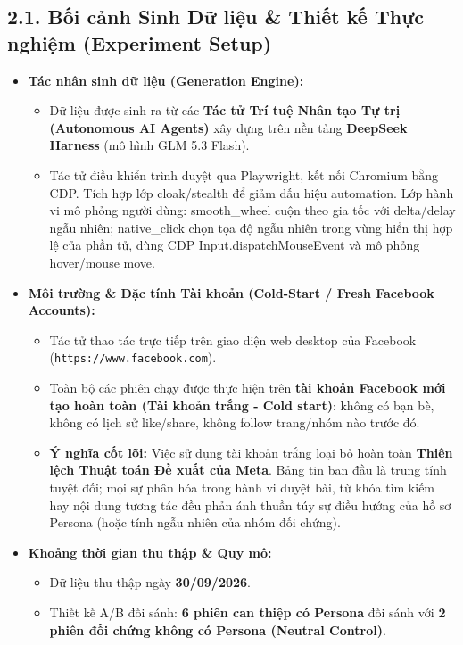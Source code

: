 \documentclass[11pt]{article}
\providecommand{\tightlist}{%
      \setlength{\itemsep}{0pt}\setlength{\parskip}{0pt}}
\begin{document}
\subsection{2.1. Bối cảnh Sinh Dữ liệu \& Thiết kế Thực nghiệm
(Experiment
Setup)}\label{bux1ed1i-cux1ea3nh-sinh-dux1eef-liux1ec7u-thiux1ebft-kux1ebf-thux1ef1c-nghiux1ec7m-experiment-setup}

\begin{itemize}
\tightlist
\item
  \textbf{Tác nhân sinh dữ liệu (Generation Engine):}

  \begin{itemize}
  \tightlist
  \item
    Dữ liệu được sinh ra từ các \textbf{Tác tử Trí tuệ Nhân tạo Tự trị
    (Autonomous AI Agents)} xây dựng trên nền tảng \textbf{DeepSeek
    Harness} (mô hình GLM 5.3 Flash).
  \item
    Tác tử điều khiển trình duyệt qua Playwright, kết nối Chromium bằng
    CDP. Tích hợp lớp cloak/stealth để giảm dấu hiệu automation. Lớp
    hành vi mô phỏng người dùng: smooth\_wheel cuộn theo gia tốc với
    delta/delay ngẫu nhiên; native\_click chọn tọa độ ngẫu nhiên trong
    vùng hiển thị hợp lệ của phần tử, dùng CDP Input.dispatchMouseEvent
    và mô phỏng hover/mouse move.
  \end{itemize}
\item
  \textbf{Môi trường \& Đặc tính Tài khoản (Cold-Start / Fresh Facebook
  Accounts):}

  \begin{itemize}
  \tightlist
  \item
    Tác tử thao tác trực tiếp trên giao diện web desktop của Facebook
    (\texttt{https://www.facebook.com}).
  \item
    Toàn bộ các phiên chạy được thực hiện trên \textbf{tài khoản
    Facebook mới tạo hoàn toàn (Tài khoản trắng - Cold start)}: không có
    bạn bè, không có lịch sử like/share, không follow trang/nhóm nào
    trước đó.
  \item
    \textbf{Ý nghĩa cốt lõi:} Việc sử dụng tài khoản trắng loại bỏ hoàn
    toàn \textbf{Thiên lệch Thuật toán Đề xuất của Meta}. Bảng tin ban
    đầu là trung tính tuyệt đối; mọi sự phân hóa trong hành vi duyệt
    bài, từ khóa tìm kiếm hay nội dung tương tác đều phản ánh thuần túy
    sự điều hướng của hồ sơ Persona (hoặc tính ngẫu nhiên của nhóm đối
    chứng).
  \end{itemize}
\item
  \textbf{Khoảng thời gian thu thập \& Quy mô:}

  \begin{itemize}
  \tightlist
  \item
    Dữ liệu thu thập ngày \textbf{30/09/2026}.
  \item
    Thiết kế A/B đối sánh: \textbf{6 phiên can thiệp có Persona} đối
    sánh với \textbf{2 phiên đối chứng không có Persona (Neutral
    Control)}.
  \end{itemize}
\end{itemize}
\end{document}
